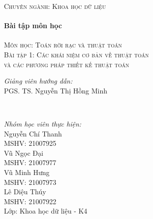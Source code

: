 \documentclass[14pt, a4paper]{article}
\theoremstyle{sltheorem}
\theoremstyle{soltheorem}
\begin{document}
\begin{titlepage}
        \textsc{\Large Chuyên ngành: Khoa học dữ liệu}\\[0.5cm] %



        \HRule \\[0.4cm]
        { \huge \bfseries Bài tập môn học}\\[0.4cm] %
        \HRule \\[1.5cm]

        \textsc{\Large Môn học: Toán rời rạc và thuật toán}\\[1cm] %


        \textsc{\Large Bài tập 1: Các khái niệm cơ bản về thuật toán \\ và các phương pháp thiết kế thuật toán}\\[1cm]


        \begin{minipage}{0.4\textwidth}
            \begin{flushleft} \large
            \emph{Giảng viên hướng dẫn:} \\
            PGS. TS. Nguyễn Thị Hồng Minh %
            \end{flushleft}
        \end{minipage}\\[0.5cm]

        \begin{minipage}{0.4\textwidth}
        \begin{flushleft} \large
        \emph{Nhóm học viên thực hiện:}\\
        Nguyễn Chí Thanh \\
        MSHV: 21007925 \\ %
        Vũ Ngọc Đại \\
        MSHV: 21007977 \\
        Vũ Minh Hưng \\
        MSHV: 21007973 \\
        Lê Diệu Thúy \\
        MSHV: 21007922 \\
        Lớp: Khoa học dữ liệu - K4
        \end{flushleft}
        \end{minipage}



\end{titlepage}
\end{document}
